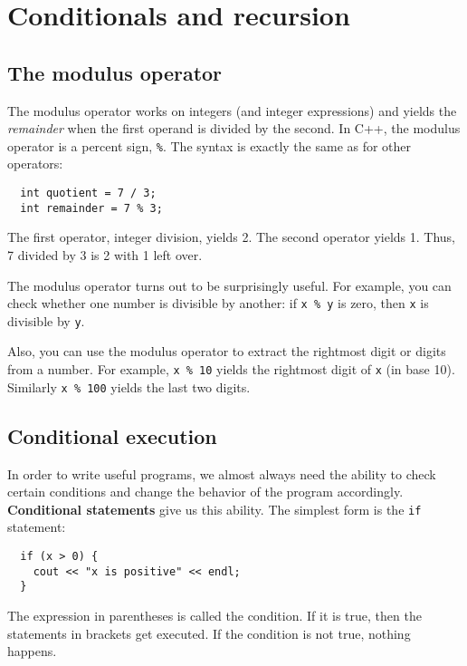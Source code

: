 



\chapter{Conditionals and recursion}
\label{condrecursion}

\section{The modulus operator}

The modulus operator works on integers (and integer expressions)
and yields the {\em remainder} when the first operand is divided
by the second.  In C++, the modulus operator is a percent sign,
{\tt \%}.  The syntax is exactly the same as for other operators:

\begin{lstlisting}
  int quotient = 7 / 3;
  int remainder = 7 % 3;
\end{lstlisting}
%
The first operator, integer division, yields 2.  The second
operator yields 1.  Thus, 7 divided by 3 is 2 with 1 left over.

The modulus operator turns out to be surprisingly useful.  For
example, you can check whether one number is divisible by
another: if {\tt x \% y} is zero, then {\tt x} is divisible
by {\tt y}.

Also, you can use the modulus operator to extract the rightmost
digit or digits from a number.  For example, {\tt x \% 10} yields
the rightmost digit of {\tt x} (in base 10).  Similarly
{\tt x \% 100} yields the last two digits.

\section{Conditional execution}

In order to write useful programs, we almost always need the ability
to check certain conditions and change the behavior of the program
accordingly.  {\bf Conditional statements} give us this ability.  The
simplest form is the {\tt if} statement:

\begin{lstlisting}
  if (x > 0) {
    cout << "x is positive" << endl;
  }
\end{lstlisting}
%
The expression in parentheses is called the condition.
If it is true, then the statements in brackets get executed.
If the condition is not true, nothing happens.

